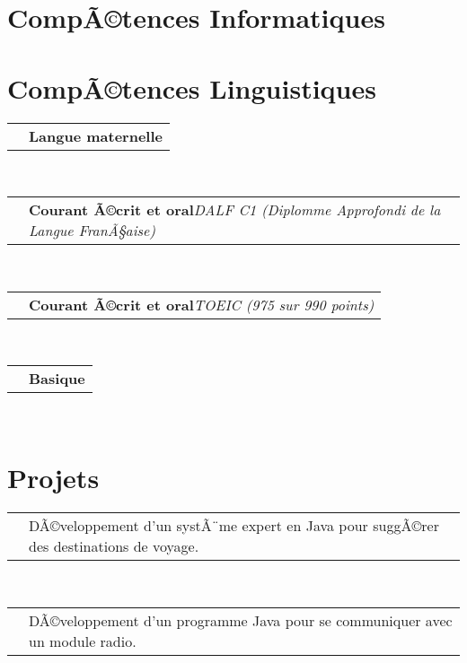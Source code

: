 \documentclass[11pt,a4paper,sans]{moderncv}
\makeatletter
\renewcommand*{\cvlanguage}[3]{%
  \cvline{#1}{\textbf{#2}\hspace*{\separatorcolumnwidth}\emph{#3}}}
\renewcommand*{\cvline}[3][.25em]{%
	  \begin{tabular}{@{}p{\hintscolumnwidth}@{\hspace{\separatorcolumnwidth}}p{\maincolumnwidth}@{}}%
          \centering\hintfont{#2} &{#3}%
	  \end{tabular}\\[#1]}
\makeatother
\begin{document}
\section{CompÃ©tences Informatiques}
\SECTIONSPACE
\section{CompÃ©tences Linguistiques}
\cvlanguage{Portugais}{Langue maternelle}{}
\cvlanguage{FranÃ§ais}{Courant Ã©crit et oral}{DALF C1 (Diplomme Approfondi de la Langue FranÃ§aise)}
\cvlanguage{Anglais}{Courant Ã©crit et oral}{TOEIC (975 sur 990 points)}
\cvlanguage{Japonais}{Basique}{}
\SECTIONSPACE
\section{Projets}
\cvline{Intelligence Artificielle}{DÃ©veloppement d'un systÃ¨me expert en Java pour suggÃ©rer des destinations de voyage. \newline{\emph{ImplÃ©mentation des mÃ©thodes de chainage et crÃ©ation de l'interface graphique en Swing}} \newline{\emph{}}\ENTRYSPACE}
\cvline{Analyse de DonnÃ©es}{DÃ©veloppement d'un programme Java pour se communiquer avec un module radio. \newline{\emph{Documentation de l'application et Ã©laboration d'un guide d'utilisation}} \newline{\emph{ContrÃ´le de version avec Git}}}
\end{document}
